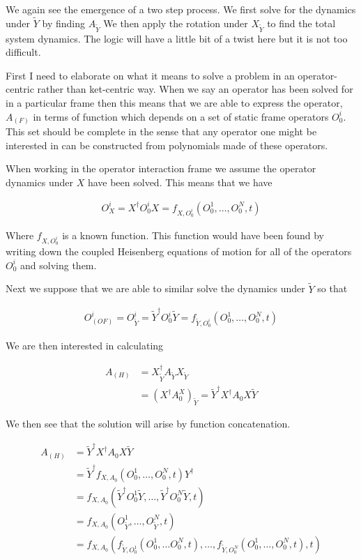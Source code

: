 \documentclass[12pt]{article}
\begin{document}
We again see the emergence of a two step process. We first solve for the dynamics under $\tilde{Y}$ by finding $A_{\tilde{Y}}$ We then apply the rotation under $X_{\tilde{Y}}$ to find the total system dynamics. The logic will have a little bit of a twist here but it is not too difficult.

First I need to elaborate on what it means to solve a problem in an operator-centric rather than ket-centric way. When we say an operator has been solved for in a particular frame then this means that we are able to express the operator, $A_{(F)}$ in terms of function which depends on a set of static frame operators ${O_0^i}$. This set should be complete in the sense that any operator one might be interested in can be constructed from polynomials made of these operators.

When working in the operator interaction frame we assume the operator dynamics under $X$ have been solved. This means that we have

\begin{align}
O_X^i = X^{\dag}O_0^i X = f_{X,O_0^i}(O_0^1, \ldots, O_0^N,t)
\end{align}

Where $f_{X,O_0^i}$ is a known function. This function would have been found by writing down the coupled Heisenberg equations of motion for all of the operators ${O_0^i}$ and solving them.

Next we suppose that we are able to similar solve the dynamics under $\tilde{Y}$ so that

\begin{align}
O_{(OF)}^i = O_{\tilde{Y}}^i = \tilde{Y}^{\dag}O_0^i \tilde{Y} = f_{\tilde{Y},O_0^i}(O_0^1, \ldots, O_0^N,t)
\end{align}

We are then interested in calculating

\begin{align}
A_{(H)} &= X_{\tilde{Y}}^{\dag} A_{\tilde{Y}} X_{\tilde{Y}}\\
&= \left(X^{\dag} A_0^ X \right)_{\tilde{Y}} = \tilde{Y}^{\dag} X^{\dag} A_0 X \tilde{Y}
\end{align}

We then see that the solution will arise by function concatenation.

\begin{align}
A_{(H)} &= \tilde{Y}^{\dag} X^{\dag} A_0 X \tilde{Y}\\
&= \tilde{Y}^{\dag}f_{X,A_0}\left(O_0^1,\ldots, O_0^N,t\right) Y^{\dag}\\
&= f_{X,A_0}\left(\tilde{Y}^{\dag}O_0^1\tilde{Y},\ldots, \tilde{Y}^{\dag}O_0^N\tilde{Y},t \right)\\
&= f_{X,A_0}\left(O_{\tilde{Y}}^1,\ldots, O_{\tilde{Y}}^N,t \right)\\
&= f_{X,A_0}\left(f_{\tilde{Y},O_0^1}(O_0^1,\ldots O_0^N,t),\ldots, f_{\tilde{Y},O_0^N}(O_0^1,\ldots,O_0^N,t),t \right)
\end{align}
\end{document}
